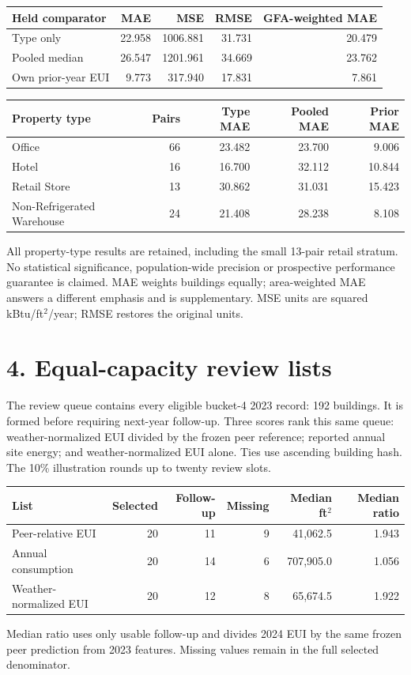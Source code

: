 \documentclass[10pt,letterpaper]{article}
\begin{document}
\begin{center}\small\begin{tabular}{lrrrr}\toprule
Held comparator & MAE & MSE & RMSE & GFA-weighted MAE\\\midrule
Type only & 22.958 & 1006.881 & 31.731 & 20.479 \\
Pooled median & 26.547 & 1201.961 & 34.669 & 23.762 \\
Own prior-year EUI & 9.773 & 317.940 & 17.831 & 7.861 \\
\bottomrule\end{tabular}\end{center}

\begin{center}\small\begin{tabular}{lrrrr}\toprule
Property type & Pairs & Type MAE & Pooled MAE & Prior MAE\\\midrule
Office & 66 & 23.482 & 23.700 & 9.006 \\
Hotel & 16 & 16.700 & 32.112 & 10.844 \\
Retail Store & 13 & 30.862 & 31.031 & 15.423 \\
Non-Refrigerated Warehouse & 24 & 21.408 & 28.238 & 8.108 \\
\bottomrule\end{tabular}\end{center}

All property-type results are retained, including the small 13-pair retail stratum. No statistical significance, population-wide precision or prospective performance guarantee is claimed. MAE weights buildings equally; area-weighted MAE answers a different emphasis and is supplementary. MSE units are squared kBtu/ft$^2$/year; RMSE restores the original units.

\newpage
\section*{4. Equal-capacity review lists}
The review queue contains every eligible bucket-4 2023 record: 192 buildings. It is formed before requiring next-year follow-up. Three scores rank this same queue: weather-normalized EUI divided by the frozen peer reference; reported annual site energy; and weather-normalized EUI alone. Ties use ascending building hash. The 10\% illustration rounds up to twenty review slots.

\begin{center}\small\begin{tabular}{lrrrrr}\toprule
List & Selected & Follow-up & Missing & Median ft$^2$ & Median ratio\\\midrule
Peer-relative EUI & 20 & 11 & 9 & 41,062.5 & 1.943 \\
Annual consumption & 20 & 14 & 6 & 707,905.0 & 1.056 \\
Weather-normalized EUI & 20 & 12 & 8 & 65,674.5 & 1.922 \\
\bottomrule\end{tabular}\end{center}
{\small Median ratio uses only usable follow-up and divides 2024 EUI by the same frozen peer prediction from 2023 features. Missing values remain in the full selected denominator.}
\end{document}
